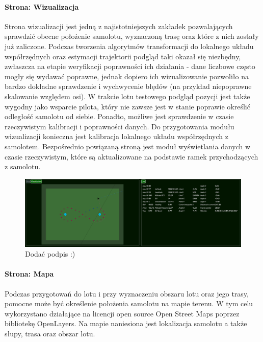 \documentclass[12pt, a4paper]{article}
\begin{document}
\FloatBarrier
 
\paragraph{Strona: Wizualizacja}\mbox{}

Strona wizualizacji jest jedną z najistotniejszych zakładek pozwalających sprawdzić obecne położenie samolotu, wyznaczoną trasę oraz które z nich zostały już zaliczone. Podczas tworzenia algorytmów transformacji do lokalnego układu współrzędnych oraz estymacji trajektorii podgląd taki okazał się niezbędny, zwłaszcza na etapie weryfikacji poprawności ich działania - dane liczbowe często mogły się wydawać poprawne, jednak dopiero ich wizualizowanie pozwoliło na bardzo dokładne sprawdzenie i wychwycenie błędów (na przykład niepoprawne skalowanie względem osi). W trakcie lotu testowego podgląd pozycji jest także wygodny jako wsparcie pilota, który nie zawsze jest w stanie poprawie określić odległość samolotu od siebie. Ponadto, możliwe jest sprawdzenie w czasie rzeczywistym kalibracji i poprawności danych. Do przygotowania modułu wizualizacji konieczna jest kalibracja lokalnego układu współrzędnych z samolotem. Bezpośrednio powiązaną stroną jest moduł wyświetlania danych w czasie rzeczywistym, które są aktualizowane na podstawie ramek przychodzących z samolotu.

 \begin{figure}[H]
    \centering
    \includegraphics[width=1\textwidth]{wizualizacja}
    \caption{Dodać podpis :)}
\end{figure}

\paragraph{Strona: Mapa}\mbox{}

Podczas przygotowań do lotu i przy wyznaczeniu obszaru lotu oraz jego trasy, pomocne może być określenie położenia samolotu na mapie terenu. W tym celu wykorzystano działające na licencji open source Open Street Maps poprzez bibliotekę OpenLayers. Na mapie naniesiona jest lokalizacja samolotu a także słupy, trasa oraz obszar lotu.
\end{document}
